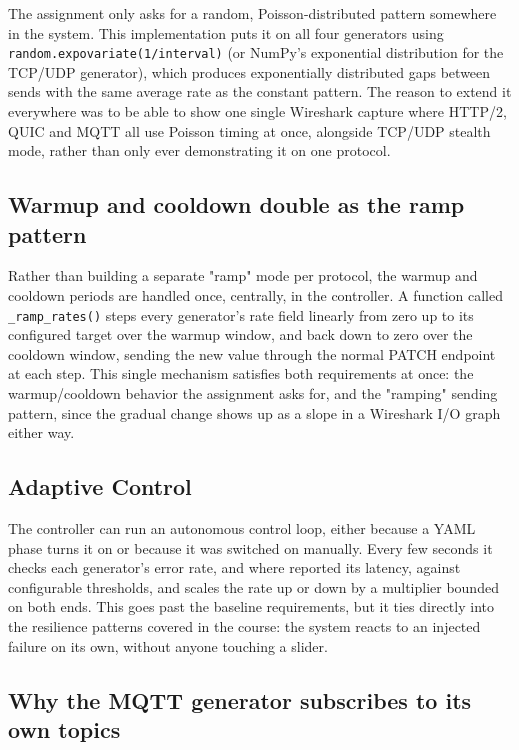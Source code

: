 The assignment only asks for a random, Poisson-distributed pattern somewhere
in the system. This implementation puts it on all four generators using
\texttt{random.expovariate(1/interval)} (or NumPy's exponential distribution
for the TCP/UDP generator), which produces exponentially distributed gaps
between sends with the same average rate as the constant pattern. The reason
to extend it everywhere was to be able to show one single Wireshark capture
where HTTP/2, QUIC and MQTT all use Poisson timing at once, alongside TCP/UDP
stealth mode, rather than only ever demonstrating it on one protocol.

\subsection{Warmup and cooldown double as the ramp pattern}

Rather than building a separate "ramp" mode per protocol, the warmup and
cooldown periods are handled once, centrally, in the controller. A function
called \texttt{\_ramp\_rates()} steps every generator's rate field linearly
from zero up to its configured target over the warmup window, and back down
to zero over the cooldown window, sending the new value through the normal
PATCH endpoint at each step. This single mechanism satisfies both
requirements at once: the warmup/cooldown behavior the assignment asks for,
and the "ramping" sending pattern, since the gradual change shows up as a
slope in a Wireshark I/O graph either way.

\subsection{Adaptive Control}

The controller can run an autonomous control loop, either because a YAML
phase turns it on or because it was switched on manually. Every few seconds it
checks each generator's error rate, and where reported its latency, against
configurable thresholds, and scales the rate up or down by a multiplier
bounded on both ends. This goes past the baseline requirements, but it ties
directly into the resilience patterns covered in the course: the system reacts
to an injected failure on its own, without anyone touching a slider.

\subsection{Why the MQTT generator subscribes to its own topics}

